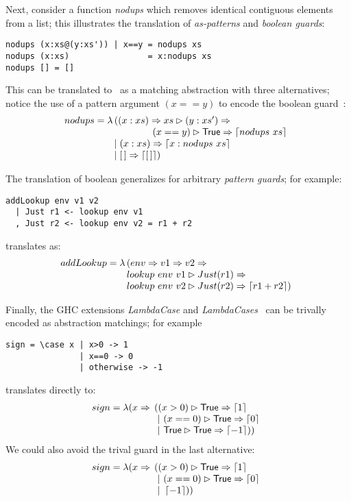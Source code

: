 Next, consider a function \emph{nodups} which removes identical contiguous elements
from a list; this illustrates the translation of 
\emph{as-patterns} and \emph{boolean guards}:
%
\begin{verbatim}
nodups (x:xs@(y:xs')) | x==y = nodups xs
nodups (x:xs)                = x:nodups xs
nodups [] = []
\end{verbatim}
%
This can be translated to \lambdaPMC\
as a matching abstraction with three alternatives;
notice the use of a pattern argument $(x==y)$ to encode the
boolean guard~\cite{kahl_2004}:
\[
  nodups = \lambda
  \!\!\begin{array}[t]{l}
    ((x:xs) \Rightarrow
    xs \rhd (y:xs') \Rightarrow \\
     \qquad\qquad (x==y) \rhd \textsf{True} \Rightarrow \left\lceil nodups~ xs\right\rceil  \\
    \mid (x:xs) \Rightarrow  \left\lceil x: nodups~xs\right\rceil \\
    \mid [\,] \Rightarrow \left\lceil [\,]\right\rceil)
  \end{array}
\]

The translation of boolean generalizes
for arbitrary \emph{pattern guards}; for example:
\begin{verbatim}
addLookup env v1 v2 
  | Just r1 <- lookup env v1
  , Just r2 <- lookup env v2 = r1 + r2
\end{verbatim}
%
translates as:
\[
  addLookup = \lambda \!\!\begin{array}[t]{l}
                     (env \Rightarrow v1 \Rightarrow v2 \Rightarrow \\
                     lookup~ env~ v1 \rhd Just(r1) \Rightarrow \\
                     lookup~ env~ v2 \rhd Just(r2) \Rightarrow  \left\lceil r1 + r2\right\rceil)
                     \end{array}
\]

Finally, the GHC extensions \emph{LambdaCase} and
\emph{LambdaCases}~\cite{ghc_guide_lambda_case} can be trivally
encoded as abstraction matchings; for example
\begin{verbatim}
sign = \case x | x>0 -> 1
               | x==0 -> 0
               | otherwise -> -1
\end{verbatim}
translates directly to:
\[ sign = \lambda (x \Rightarrow \!\!\begin{array}[t]{l}
  ((x>0) \rhd  \textsf{True} \Rightarrow \left\lceil 1\right\rceil \\
  ~|~ (x==0)\rhd \textsf{True} \Rightarrow \left\lceil 0\right\rceil\\
  ~|~ \textsf{True} \rhd \textsf{True} \Rightarrow  \left\lceil -1\right\rceil ))
 \end{array}    
\]
%
We could also avoid the trival guard in the last alternative:
%
\[ sign = \lambda (x \Rightarrow \!\!\begin{array}[t]{l}
  ((x>0) \rhd  \textsf{True} \Rightarrow \left\lceil 1\right\rceil \\
  ~|~ (x==0)\rhd \textsf{True} \Rightarrow \left\lceil 0\right\rceil\\
  ~|~  \left\lceil -1\right\rceil ))
 \end{array}    
\]




